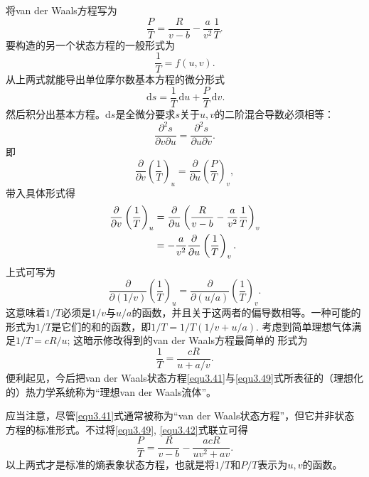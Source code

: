 将van der Waals方程写为
\begin{equation}
	\frac{P}{T} = \frac{R}{v - b} - \frac{a}{v^2} \frac{1}{T}.
\label{equ3.42}
\end{equation}
要构造的另一个状态方程的一般形式为
\begin{equation}
	\frac{1}{T} = f(u, v).
\label{equ3.43}
\end{equation}
从上两式就能导出单位摩尔数基本方程的微分形式
\begin{equation}
	\,\mathrm ds = \frac{1}{T}\,\mathrm du + \frac{P}{T}\,\mathrm dv.
\label{equ3.44}
\end{equation}
然后积分出基本方程。$\mathrm ds$是全微分要求$s$关于$u, v$的二阶混合导数必须相等：
\begin{equation}
	\frac{\partial^2 s}{\partial v \partial u} = \frac{\partial^2 s}{\partial u \partial v}.
\label{equ3.45}
\end{equation}
即
\begin{equation}
    \frac{\partial}{\partial v} \left( \frac{1}{T} \right)_u = \frac{\partial}{\partial u} \left( \frac{P}{T} \right)_v,
\label{equ3.46}
\end{equation}
带入具体形式得
\begin{align}
    \frac{\partial}{\partial v} \left( \frac{1}{T} \right)_u &= \frac{\partial}{\partial u} \left( \frac{R}{v - b} - \frac{a}{v^2} \frac{1}{T} \right)_v \notag \\
    &= -\frac{a}{v^2} \frac{\partial}{\partial u} \left( \frac{1}{T} \right)_v.
\label{equ3.47}
\end{align}
上式可写为
\begin{equation}
    \frac{\partial}{\partial (1/v)} \left( \frac{1}{T} \right)_u = \frac{\partial}{\partial(u/a)} \left( \frac{1}{T} \right)_v.
\label{equ3.48}
\end{equation}
这意味着$1/T$必须是$1/v$与$u/a$的函数，并且关于这两者的偏导数相等。一种可能的形式为$1/T$是它们的和的函数，即$1/T = 1/T(1/v + u/a)$. 考虑到简单理想气体满足$1/T = cR/u$; 这暗示修改得到的van der Waals方程最简单的 形式为
\begin{equation}
    \frac{1}{T} = \frac{cR}{u + a/v}.
\label{equ3.49}
\end{equation}
便利起见，今后把van der Waals状态方程\eqref{equ3.41}与\eqref{equ3.49}式所表征的（理想化的）热力学系统称为“理想van der Waals流体”。

应当注意，尽管\eqref{equ3.41}式通常被称为“van der Waals状态方程”，但它并非状态方程的标准形式。不过将\eqref{equ3.49}, \eqref{equ3.42}式联立可得
\begin{equation}
    \frac{P}{T} = \frac{R}{v - b} - \frac{acR}{uv^2 + av}.
\label{equ3.50}
\end{equation}
以上两式才是标准的熵表象状态方程，也就是将$1/T$和$P/T$表示为$u, v$的函数。

